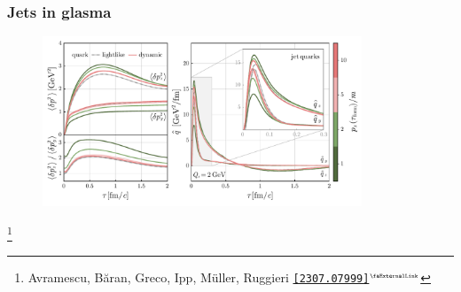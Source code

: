 \documentclass[aspectratio=169,11pt,usenames,dvipsnames]{beamer}
\renewcommand{\thefootnote}{\color{customblue}\faPaperPlaneO}
\newcommand\blfootnote[1]{%
  \begingroup
  \renewcommand\thefootnote{}\footnote{#1}%
  \addtocounter{footnote}{-1}%
  \endgroup
}
\begin{document}

\begin{frame}
    \frametitle{Jets in glasma}
    \begin{center}
        \begin{figure}
            \centering
            \includegraphics[width=0.85\textwidth]{images/hp23_mom_broad_qhat_anis_wong_vs_qhat.pdf}
        \end{figure}
    \end{center}
    \vspace{-20pt}
    \blfootnote{\scriptsize Avramescu, Băran, Greco, Ipp, Müller, Ruggieri  \href{https://arxiv.org/abs/2307.07999}{{\color{palgold}\texttt{[2307.07999]}$^\text{\tiny\faExternalLink}$}}}
\end{frame}

\end{document}
